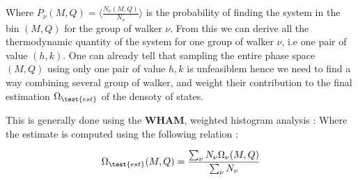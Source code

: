 \documentclass[ansiapaper]{report}
\begin{document}
\begin{multicols}{3}
Where $ P_{\nu}(M,Q) = \langle \frac{N_{\nu}(M,Q)}{N_{\nu}}\rangle $ is the probability of finding the system in the bin $(M,Q)$ for the group of walker $\nu$. From this we can derive all the thermodynamic quantity of the system for one group of walker $\nu$, i.e one pair of value $(h,k)$. One can already tell that sampling the entire phase space $(M,Q)$ using only one pair of value $h,k$ is unfeasiblem hence we need to find a way combining several group of walker, and weight their contribution to the final estimation $\Omega_{\test{est}}$ of the densoty of states. 

This is generally done using the \textbf{WHAM}, weighted histogram analysis : Where the estimate is computed using the following relation : 

    \begin{equation}
        \Omega_{\test{est}}(M,Q) = \frac{\sum_{\nu} N_{\nu} \Omega_{\nu}(M,Q)}{\sum_{\nu} N_{\nu}}
        \label{eq:WHAM}
    \end{equation}



\end{multicols}
\end{document}

